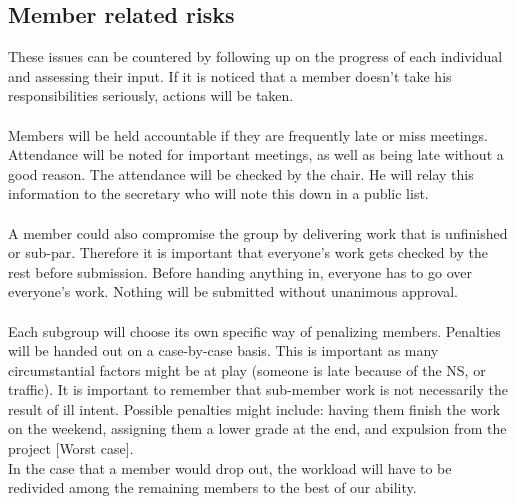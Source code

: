 \subsection{Member related risks}
These issues can be countered by following up on the progress of each individual and assessing their input. If it is noticed that a member doesn't take his responsibilities seriously, actions will be taken.\\\\
Members will be held accountable if they are frequently late or miss meetings. Attendance will  be noted for important meetings, as well as being late without a good reason. The attendance will be checked by the chair. He will relay this information to the secretary who will note this down in a public list. \\\\ A member could also compromise the group by delivering work that is unfinished or sub-par. Therefore it is important that everyone's work gets checked by the rest before submission. Before handing anything in, everyone has to go over everyone's work. Nothing will be submitted without unanimous approval. \\\\
Each subgroup will choose its own specific way of penalizing members. Penalties will be handed out on a case-by-case basis. This is important as many circumstantial factors might be at play (someone is late because of the NS, or traffic). It is important to remember that sub-member work is not necessarily the result of ill intent. Possible penalties might include: having them finish the work on the weekend, assigning them a lower grade at the end, and expulsion from the project [Worst case].
\\
In the case that a member would drop out, the workload will have to be redivided among the remaining members to the best of our ability.

